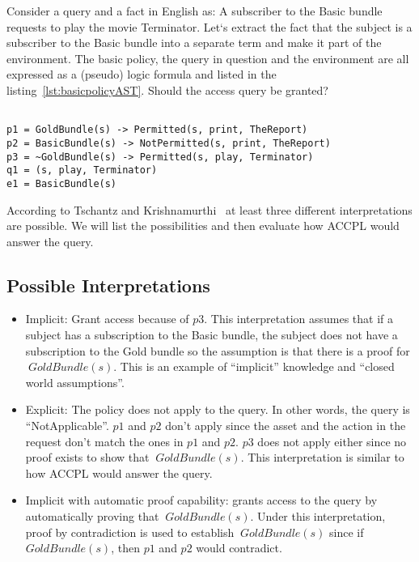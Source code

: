 Consider a query and a fact in English as: A subscriber to the Basic bundle requests to play the movie Terminator. Let`s extract the fact that the subject is a subscriber to the Basic bundle into a separate term and make it part of the environment. The basic policy, the query in question and the environment are all expressed as a (pseudo) logic formula and listed in the listing~\ref{lst:basicpolicyAST}. Should the access query be granted?

\lstset{mathescape, language=AST}  
\begin{lstlisting}[frame=single, caption={Basic Policy},label={lst:basicpolicyAST}]

p1 = GoldBundle(s) -> Permitted(s, print, TheReport) 
p2 = BasicBundle(s) -> NotPermitted(s, print, TheReport) 
p3 = ~GoldBundle(s) -> Permitted(s, play, Terminator)
q1 = (s, play, Terminator) 
e1 = BasicBundle(s)
\end{lstlisting}


According to Tschantz and Krishnamurthi~\cite{Tschantz} at least three different interpretations are possible. We will list the possibilities and then evaluate how \ac{ACCPL} would answer the query.

\subsection{Possible Interpretations}\label{sec:threeinterpretations}
\begin{itemize}
\item Implicit: Grant access because of $p3$. This interpretation assumes that if a subject has a subscription to the Basic bundle, the subject does not have a subscription to the Gold bundle so the assumption is that there is a proof for $~GoldBundle(s)$. This is an example of ``implicit'' knowledge and ``closed world assumptions''.

\item Explicit: The policy does not apply to the query. In other words, the query is ``NotApplicable''. $p1$ and $p2$ don't apply since the asset and the action in the request don't match the ones in $p1$ and $p2$. $p3$ does not apply either since no proof exists to show that $~GoldBundle(s)$. This interpretation is similar to how \ac{ACCPL} would answer the query.

\item Implicit with automatic proof capability: grants access to the query by automatically proving that $~GoldBundle(s)$. Under this interpretation, proof by contradiction is used to establish $~GoldBundle(s)$ since if $GoldBundle(s)$, then $p1$ and $p2$ would contradict.
\end{itemize}

